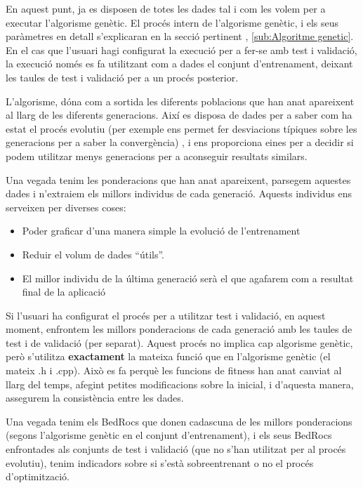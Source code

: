 

En aquest punt, ja es disposen de totes les dades tal i com les volem per a
executar l'algorisme genètic.  El procés intern de l'algorisme genètic, i els
seus paràmetres en detall s'explicaran en la secció pertinent ,
\ref{sub:Algoritme genetic}.  En el cas que l'usuari hagi configurat la execució
per a fer-se amb test i validació, la execució només es fa utilitzant com a
dades el conjunt d'entrenament, deixant les taules de test i validació per a
un procés posterior.

L'algorisme, dóna com a sortida les diferents poblacions que han anat apareixent
al llarg de les diferents generacions.  Així es disposa de dades per a saber com
ha estat el procés evolutiu (per exemple ens permet fer desviacions típiques
sobre les generacions per a saber la convergència) , i ens proporciona eines per
a decidir si podem utilitzar menys generacions per a aconseguir resultats
similars.

Una vegada tenim les ponderacions que han anat apareixent, parsegem aquestes
dades i n'extraiem els millors individus de cada generació.  Aquests individus
ens serveixen per diverses coses:

\begin{itemize}
	\item Poder graficar d'una manera simple la evolució de l'entrenament
	\item Reduir el volum de dades ``útils''.
	\item El millor individu de la última generació serà el que agafarem com a
	resultat final de la aplicació
\end{itemize}

Si l'usuari ha configurat el procés per a utilitzar test i validació, en
aquest moment, enfrontem les millors ponderacions de cada generació amb les
taules de test i de validació (per separat).  Aquest procés no implica cap
algorisme genètic, però s'utilitza \textbf{exactament} la mateixa funció que en
l'algorisme genètic (el mateix .h i .cpp).  Això es fa perquè les funcions de
fitness han anat canviat al llarg del temps, afegint petites modificacions sobre
la inicial, i d'aquesta manera, assegurem la consistència entre les dades.

Una vegada tenim els BedRocs que donen cadascuna de les millors ponderacions
(segons l'algorisme genètic en el conjunt d'entrenament), i els seus BedRocs
enfrontades als conjunts de test i validació (que no s'han utilitzat per al
procés evolutiu), tenim indicadors sobre si s'està sobreentrenant o no el procés
d'optimització.

